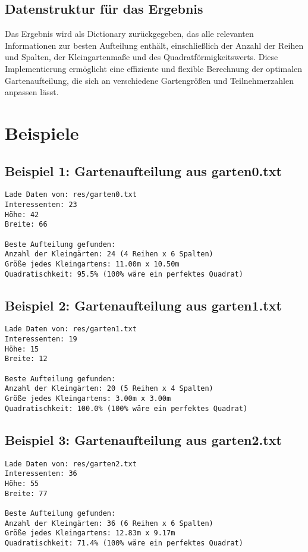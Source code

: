 \documentclass[a4paper,10pt,ngerman]{scrartcl}
\begin{document}
\subsection{Datenstruktur für das Ergebnis}
Das Ergebnis wird als Dictionary zurückgegeben, das alle relevanten Informationen zur besten Aufteilung enthält, einschließlich der Anzahl der Reihen und Spalten, der Kleingartenmaße und des Quadratförmigkeitswerts. Diese Implementierung ermöglicht eine effiziente und flexible Berechnung der optimalen Gartenaufteilung, die sich an verschiedene Gartengrößen und Teilnehmerzahlen anpassen lässt.

\section{Beispiele}

\subsection{Beispiel 1: Gartenaufteilung aus garten0.txt}
\begin{verbatim}
Lade Daten von: res/garten0.txt
Interessenten: 23
Höhe: 42
Breite: 66

Beste Aufteilung gefunden:
Anzahl der Kleingärten: 24 (4 Reihen x 6 Spalten)
Größe jedes Kleingartens: 11.00m x 10.50m
Quadratischkeit: 95.5% (100% wäre ein perfektes Quadrat)
\end{verbatim}

\subsection{Beispiel 2: Gartenaufteilung aus garten1.txt}
\begin{verbatim}
Lade Daten von: res/garten1.txt
Interessenten: 19
Höhe: 15
Breite: 12

Beste Aufteilung gefunden:
Anzahl der Kleingärten: 20 (5 Reihen x 4 Spalten)
Größe jedes Kleingartens: 3.00m x 3.00m
Quadratischkeit: 100.0% (100% wäre ein perfektes Quadrat)
\end{verbatim}

\subsection{Beispiel 3: Gartenaufteilung aus garten2.txt}
\begin{verbatim}
Lade Daten von: res/garten2.txt
Interessenten: 36
Höhe: 55
Breite: 77

Beste Aufteilung gefunden:
Anzahl der Kleingärten: 36 (6 Reihen x 6 Spalten)
Größe jedes Kleingartens: 12.83m x 9.17m
Quadratischkeit: 71.4% (100% wäre ein perfektes Quadrat)
\end{verbatim}
\end{document}
